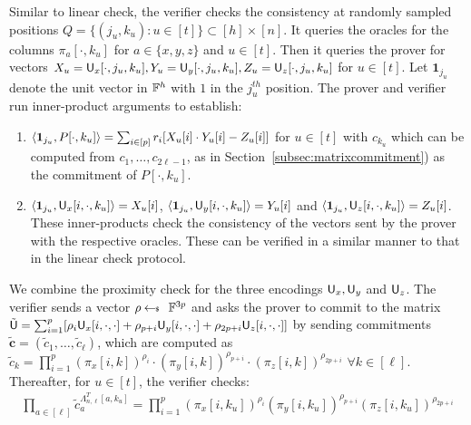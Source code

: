  Similar to linear check, the verifier checks the consistency at randomly sampled positions $Q=\{(j_u,k_u) : u\in[t] \}
\subset [h]\times[n]$. It queries the oracles for the columns $\pi_a[\cdot, k_u]$ for $a\in \{x,y,z\}$ and $u\in [t]$. Then it queries the prover for vectors $X_u = \ewit_x[\cdot,j_u,k_u], Y_u = \ewit_y[\cdot, j_u,k_u], Z_u = \ewit_z[\cdot,j_u,k_u]$ for $u\in [t]$. Let $\bm{1}_{j_u}$ denote the unit vector in $\FF^h$ with $1$ in the $j_u^{th}$ position. The prover and verifier run inner-product arguments to establish: 
\begin{enumerate}[{\rm 1.}]
	\item $\innp{\bm{1}_{j_u}}{P[\cdot,k_u]} = \sum_{i\in[p]} r_i[X_u[i]\cdot Y_u[i] - Z_u[i]]$ for $u\in[t]$ with $c_{k_u}$ which can be computed from $c_1,\ldots,c_{2\ell-1}$, as in Section~\ref{subsec:matrixcommitment})  as the commitment of  $P[\cdot,k_u]$.
	\item $\innp{\bm{1}_{j_u}}{\ewit_x[i,\cdot,k_u]} = X_u[i]$, $\innp{\bm{1}_{j_u}}{\ewit_y[i,\cdot,k_u]}=Y_u[i]$ and $\innp{\bm{1}_{j_u}}{\ewit_z[i,\cdot,k_u]}=Z_u[i]$. These inner-products check the consistency of the vectors sent by the prover with the respective oracles. These can be verified in a similar manner to that in the linear check protocol.
\end{enumerate}
\smallskip
{} We combine the proximity check for the three encodings $\ewit_x,\ewit_y$ and $\ewit_z$. The verifier sends a vector $\rho\sample \FF^{3p}$ and asks the prover to commit to the matrix $\tilde{\ewit}=\sum_{i=1}^p[\rho_i\ewit_x[i,\cdot,\cdot] + \rho_{p+i}\ewit_y[i,\cdot,\cdot]+\rho_{2p+i}\ewit_z[i,\cdot,\cdot]]$
by sending commitments $\tilde{\bm{c}}=(\tilde{c}_1,\ldots,\tilde{c}_\ell)$, which are computed as $\tilde{c}_k = \prod_{i=1}^{p} (\pi_x[i,k])^{\rho_i} \cdot (\pi_y[i,k])^{\rho_{p+i}}\cdot(\pi_z[i,k])^{\rho_{2p+i}}$ $\forall k\in[\ell]$. Thereafter, for $u\in [t]$, the verifier checks: %
{\small
\begin{align}\label{eq:combinedproximity}
\prod_{a\in[\ell]} \tilde{c}_a^{\Lambda_{n,\ell}^T[a,k_u]} =  \prod_{i=1}^{p} (\pi_x[i,k_u])^{\rho_i} (\pi_y[i,k_u])^{\rho_{p+i}}(\pi_z[i,k_u])^{\rho_{2p+i}}
\end{align}
}
